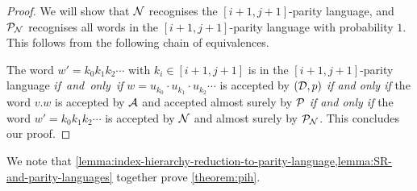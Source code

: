 \begin{proof}
     We will show that $\mathcal{N}$ recognises the $[i+1,j+1]$-parity language, and $\mathcal{P}_{\mathcal{N}}$ recognises all words in the $[i+1,j+1]$-parity language with probability $1$. This follows from the following chain of equivalences. 
     
     The word $w'=k_0 k_1 k_2 \cdots$ with $k_i \in [i+1,j+1]$ is in the $[i+1,j+1]$-parity language \emph{if~and~only~if}  $w=u_{k_0}\cdot u_{k_1} \cdot u_{k_2} \cdots $ is accepted by $(\mathcal{D},p)$ \emph{if and only if} the word $v.w$ is accepted by $\mathcal{A}$ and accepted almost surely by $\mathcal{P}$ \emph{if and only if} the word $w'=k_0 k_1 k_2 \cdots$ is accepted by $\mathcal{N}$ and almost surely by $\mathcal{P}_{\mathcal{N}}$. This concludes our proof. 
\end{proof}

We note that \cref{lemma:index-hierarchy-reduction-to-parity-language,lemma:SR-and-parity-languages} together prove \cref{theorem:pih}. 